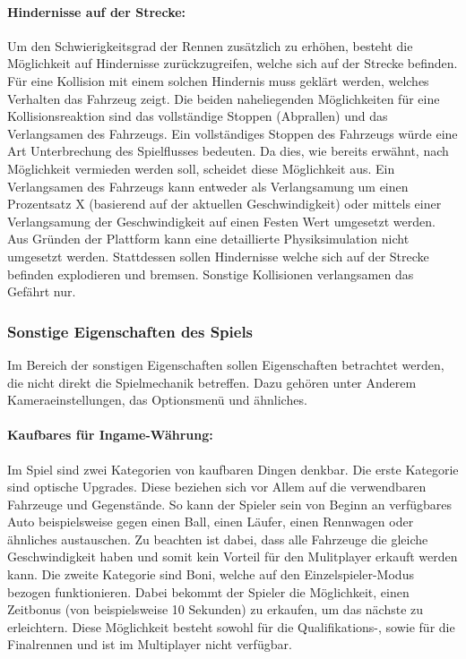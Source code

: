 		\paragraph{Hindernisse auf der Strecke:}
		Um den Schwierigkeitsgrad der Rennen zusätzlich zu erhöhen, besteht die Möglichkeit auf Hindernisse zurückzugreifen, welche sich auf der Strecke befinden. Für eine Kollision mit einem solchen Hindernis muss geklärt werden, welches Verhalten das Fahrzeug zeigt. Die beiden naheliegenden Möglichkeiten für eine Kollisionsreaktion sind das vollständige Stoppen (Abprallen) und das Verlangsamen des Fahrzeugs.
		Ein vollständiges Stoppen des Fahrzeugs würde eine Art Unterbrechung des Spielflusses bedeuten. Da dies, wie bereits erwähnt, nach Möglichkeit vermieden werden soll, scheidet diese Möglichkeit aus. Ein Verlangsamen des Fahrzeugs kann entweder als Verlangsamung um einen Prozentsatz X (basierend auf der aktuellen Geschwindigkeit) oder mittels einer Verlangsamung der Geschwindigkeit auf einen Festen Wert umgesetzt werden.
		Aus Gründen der Plattform kann eine detaillierte Physiksimulation nicht umgesetzt werden. Stattdessen sollen Hindernisse welche sich auf der Strecke befinden explodieren und bremsen. Sonstige Kollisionen verlangsamen das Gefährt nur.

	\subsubsection{Sonstige Eigenschaften des Spiels}
	Im Bereich der sonstigen Eigenschaften sollen Eigenschaften betrachtet werden, die nicht direkt die Spielmechanik betreffen. Dazu gehören unter Anderem Kameraeinstellungen, das Optionsmenü und ähnliches.

		\paragraph{Kaufbares für Ingame-Währung:}
		Im Spiel sind zwei Kategorien von kaufbaren Dingen denkbar. Die erste Kategorie sind optische Upgrades. Diese beziehen sich vor Allem auf die verwendbaren Fahrzeuge und Gegenstände. So kann der Spieler sein von Beginn an verfügbares Auto beispielsweise gegen einen Ball, einen Läufer, einen Rennwagen oder ähnliches austauschen. Zu beachten ist dabei, dass alle Fahrzeuge die gleiche Geschwindigkeit haben und somit kein Vorteil für den Mulitplayer erkauft werden kann. Die zweite Kategorie sind Boni, welche auf den Einzelspieler-Modus bezogen funktionieren. Dabei bekommt der Spieler die Möglichkeit, einen Zeitbonus (von beispielsweise 10 Sekunden) zu erkaufen, um das nächste zu erleichtern. Diese Möglichkeit besteht sowohl für die Qualifikations-, sowie für die Finalrennen und ist im Multiplayer nicht verfügbar.


